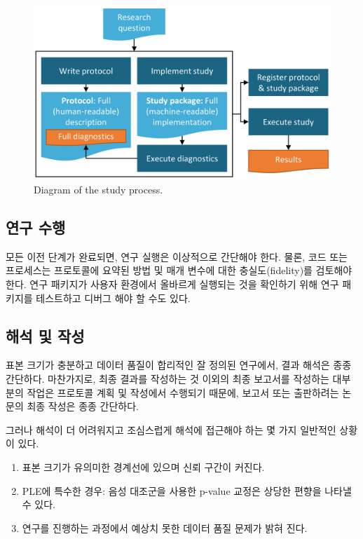 \documentclass[11pt]{book}
\theoremstyle{definition}
\theoremstyle{definition}
\theoremstyle{definition}
\theoremstyle{remark}
\begin{document}
\begin{figure}

{\centering \includegraphics[width=0.9\linewidth]{images/StudySteps/studyProcess} 

}

\caption{Diagram of the study process.}\label{fig:studyProcess}
\end{figure}

\subsection{연구 수행}\label{-}

모든 이전 단계가 완료되면, 연구 실행은 이상적으로 간단해야 한다. 물론,
코드 또는 프로세스는 프로토콜에 요약된 방법 및 매개 변수에 대한
충실도(fidelity)를 검토해야 한다. 연구 패키지가 사용자 환경에서 올바르게
실행되는 것을 확인하기 위해 연구 패키지를 테스트하고 디버그 해야 할 수도
있다.

\subsection{해석 및 작성}\label{--}

표본 크기가 충분하고 데이터 품질이 합리적인 잘 정의된 연구에서, 결과
해석은 종종 간단하다. 마찬가지로, 최종 결과를 작성하는 것 이외의 최종
보고서를 작성하는 대부분의 작업은 프로토콜 계획 및 작성에서 수행되기
때문에, 보고서 또는 출판하려는 논문의 최종 작성은 종종 간단하다.

그러나 해석이 더 어려워지고 조심스럽게 해석에 접근해야 하는 몇 가지
일반적인 상황이 있다.

\begin{enumerate}
\def\labelenumi{\arabic{enumi}.}
\item
  표본 크기가 유의미한 경계선에 있으며 신뢰 구간이 커진다.
\item
  PLE에 특수한 경우: 음성 대조군을 사용한 p-value 교정은 상당한 편향을
  나타낼 수 있다.
\item
  연구를 진행하는 과정에서 예상치 못한 데이터 품질 문제가 밝혀 진다.
\end{enumerate}
\end{document}
